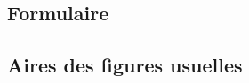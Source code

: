 
\begin{pageCours} %


\section{Formulaire}

\subsection{Aires des figures usuelles}


\end{pageCours}
